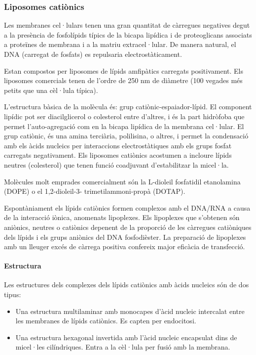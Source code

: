 \subsubsection{Liposomes catiònics}
\label{sec:liposomes-cationics}

Les membranes cel·lulars tenen una gran quantitat de càrregues negatives degut a la presència de fosfolípids típics de la bicapa lipídica i de proteoglicans associats a proteïnes de membrana i a la matriu extracel·lular. De manera natural, el DNA (carregat de fosfats) es repulsaria electrostàticament.

Estan compostos per liposomes de lípids amfipàtics carregats positivament. Els liposomes comercials tenen de l'ordre de 250 nm de diàmetre (100 vegades més petits que una cèl·lula típica).

L'estructura bàsica de la molècula és: grup catiònic-espaiador-lípid. El component lipídic pot ser diacilglicerol o colesterol entre d'altres, i és la part hidròfoba que permet l'auto-agregació com en la bicapa lipídica de la membrana cel·lular. El grup catiònic, és una amina terciària, polilisina, o altres, i permet la condensació amb els àcids nucleics per interaccions electrostàtiques amb els grups fosfat carregats negativament. Els liposomes catiònics acostumen a incloure lípids neutres (colesterol) que tenen funció coadjuvant d'estabilitzar la micel·la.

Molècules molt emprades comercialment són la L-dioleil fosfatidil etanolamina (DOPE) o el 1,2-dioleil-3- trimetilammoni-propà (DOTAP). 

Espontàniament els lípids catiònics formen complexos amb el DNA/RNA a causa de la interacció iònica, anomenats lipoplexes. Els lipoplexes que s'obtenen són aniònics, neutres o catiònics depenent de la proporció de les càrregues catiòniques dels lípids i els grups aniònics del DNA fosfodièster. La preparació de lipoplexes amb un lleuger excés de càrrega positiva confereix major eficàcia de transfecció.

\paragraph{Estructura}

Les estructures dels complexes dels lípids catiònics amb àcids nucleics són de dos tipus:

\begin{itemize}
\item Una estructura multilaminar amb monocapes d'àcid nucleic intercalat entre les membranes de lípids catiònics. Es capten per endocitosi.

\item Una estructura hexagonal invertida amb l'àcid nucleic encapsulat dins de micel·les cilíndriques. Entra a la cèl·lula per fusió amb la membrana.
\end{itemize}

